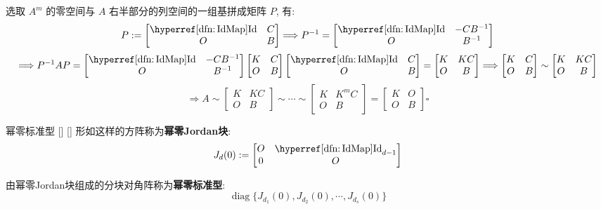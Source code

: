 \documentclass[UTF8]{ctexart}
\DeclareMathOperator{\0}{\mathbf{0}}
\DeclareMathOperator{\<}{\langle}
\renewcommand{\>}{\rangle}
\DeclareMathOperator{\diag}{diag}
\begin{document}
\begin{prf}
			选取 \(A^m\) 的零空间与 \(A\) 右半部分的列空间的一组基拼成矩阵 \(P\), 有: 
			\[P:=
			\begin{bmatrix}
				\Id & C\\
				O & B
			\end{bmatrix}
			\Longrightarrow
			P^{-1}=
			\begin{bmatrix}
				\Id & -C B^{-1}\\
				O & B^{-1}
			\end{bmatrix}\]
			\[\Longrightarrow P^{-1}AP=
			\begin{bmatrix}
				\Id & -C B^{-1}\\
				O & B^{-1}
			\end{bmatrix}
			\begin{bmatrix}
				K & C\\
				O & B
			\end{bmatrix}
			\begin{bmatrix}
				\Id & C\\
				O & B
			\end{bmatrix}
			=
			\begin{bmatrix}
				K & KC\\
				O & B
			\end{bmatrix}
			\Longrightarrow
			\begin{bmatrix}
				K & C\\
				O & B
			\end{bmatrix}
			\sim
			\begin{bmatrix}
				K & KC\\
				O & B
			\end{bmatrix}\]
			\[\Longrightarrow
			A\sim
			\begin{bmatrix}
				K & KC\\
				O & B
			\end{bmatrix}
			\sim
			\cdots
			\sim
			\begin{bmatrix}
				K & K^m C\\
				O & B
			\end{bmatrix}
			=
			\begin{bmatrix}
				K & O\\
				O & B
			\end{bmatrix}\square\]
		\end{prf}
		
		\begin{dfn}
			[]
			{幂零标准型}
			[]
			[]
			形如这样的方阵称为\textbf{幂零Jordan块}: 
			\[J_d(0):=
			\begin{bmatrix}
				O & \Id_{d-1}\\
				0 & O
			\end{bmatrix}\]

			由幂零Jordan块组成的分块对角阵称为\textbf{幂零标准型}: 
			\[\diag\{J_{d_1}(0),J_{d_2}(0),\cdots,J_{d_s}(0)\}\]
		\end{dfn}
		
\end{document}
